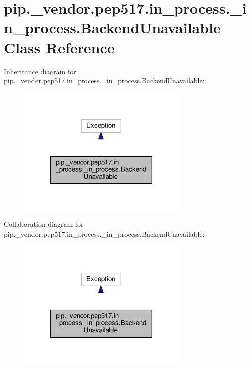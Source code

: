 \hypertarget{classpip_1_1__vendor_1_1pep517_1_1in__process_1_1__in__process_1_1BackendUnavailable}{}\section{pip.\+\_\+vendor.\+pep517.\+in\+\_\+process.\+\_\+in\+\_\+process.\+Backend\+Unavailable Class Reference}
\label{classpip_1_1__vendor_1_1pep517_1_1in__process_1_1__in__process_1_1BackendUnavailable}


Inheritance diagram for pip.\+\_\+vendor.\+pep517.\+in\+\_\+process.\+\_\+in\+\_\+process.\+Backend\+Unavailable\+:
\nopagebreak
\begin{figure}[H]
\begin{center}
\leavevmode
\includegraphics[width=233pt]{classpip_1_1__vendor_1_1pep517_1_1in__process_1_1__in__process_1_1BackendUnavailable__inherit__graph}
\end{center}
\end{figure}


Collaboration diagram for pip.\+\_\+vendor.\+pep517.\+in\+\_\+process.\+\_\+in\+\_\+process.\+Backend\+Unavailable\+:
\nopagebreak
\begin{figure}[H]
\begin{center}
\leavevmode
\includegraphics[width=233pt]{classpip_1_1__vendor_1_1pep517_1_1in__process_1_1__in__process_1_1BackendUnavailable__coll__graph}
\end{center}
\end{figure}
